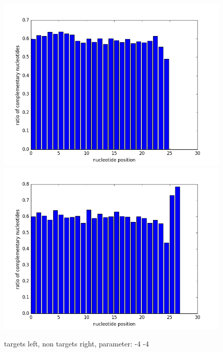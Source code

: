 \documentclass[12pt]{article}
\begin{document}
\begin{figure}
\includegraphics[scale=0.2]{results/ratio-4-4.png}
\includegraphics[scale=0.2]{results/non-ratio-4-4.png}
\caption {targets left, non targets right, parameter: -4 -4}
\label{fig:plot5}
\end{figure}
\end{document}
